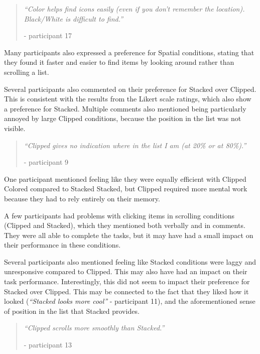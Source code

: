 \documentclass[nobib]{tufte-book} %
\begin{document}
\begin{quote}
  \emph{``Color helps find icons easily (even if you don't remember the location). Black/White is difficult to find.''}

  - participant 17
\end{quote}

Many participants also expressed a preference for Spatial conditions, stating that they found it faster and easier to find items by looking around rather than scrolling a list.

Several participants also commented on their preference for Stacked over Clipped. This is consistent with the results from the Likert scale ratings, which also show a preference for Stacked.
Multiple comments also mentioned being particularly annoyed by large Clipped conditions, because the position in the list was not visible.

\begin{quote}
  \emph{``Clipped gives no indication where in the list I am (at 20\% or at 80\%).''}

  - participant 9
\end{quote}

One participant mentioned feeling like they were equally efficient with Clipped Colored compared to Stacked Stacked, but Clipped required more mental work because they had to rely entirely on their memory.

A few participants had problems with clicking items in scrolling conditions (Clipped and Stacked), which they mentioned both verbally and in comments. They were all able to complete the tasks, but it may have had a small impact on their performance in these conditions.

Several participants also mentioned feeling like Stacked conditions were laggy and unresponsive compared to Clipped. This may also have had an impact on their task performance. Interestingly, this did not seem to impact their preference for Stacked over Clipped. This may be connected to the fact that they liked how it looked (\emph{``Stacked looks more cool''} - participant 11), and the aforementioned sense of position in the list that Stacked provides.

\begin{quote}
  \emph{``Clipped scrolls more smoothly than Stacked.''}

  - participant 13
\end{quote}

\end{document}
